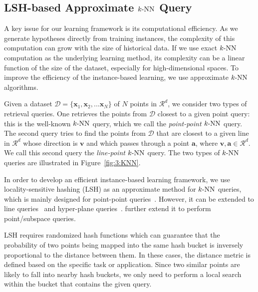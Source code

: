 \begin{figure}[htb]
  \label{fig:3:oracle}
\end{figure}


\subsection{LSH-based Approximate $k\text{-NN}$ Query}
\label{sec:3:overview:lsh}
A key issue for our learning framework is its computational efficiency. As we generate hypotheses directly from training instances, the complexity of this computation can grow with the size of historical data. If we use exact $k\text{-NN}$ computation as the underlying learning method, its complexity can be a linear function of the size of the dataset, especially for high-dimensional spaces. To improve the efficiency of the instance-based learning, we use approximate $k\text{-NN}$ algorithms.

Given a dataset $\mathcal D = \{\mathbf x_1, \mathbf x_2, ... \mathbf x_N\}$ of $N$ points in $\mathcal R^d$, we consider two types of retrieval queries. One retrieves the points from $\mathcal D$ closest to a given point query: this is the well-known $k\text{-NN}$ query, which we call the \emph{point-point $k\text{-NN}$} query. The second query tries to find the points from $\mathcal D$ that are closest to a given line in $\mathcal R^d$ whose direction is $\mathbf v$ and which passes through a point $\mathbf a$, where $\mathbf v, \mathbf a \in \mathcal R^d$. We call this second query the \emph{line-point $k\text{-NN}$} query. The two types of $k\text{-NN}$ queries are illustrated in Figure~\ref{fig:3:KNN}.


In order to develop an efficient instance-based learning framework, we use locality-sensitive hashing (LSH) as an approximate method for $k\text{-NN}$ queries, which is mainly designed for point-point queries~\cite{Andoni:2008:NHA}. However, it can be extended to line queries~\cite{Andoni:2009:ALN} and hyper-plane queries~\cite{Jain:nips:2010}. \cite{Basri:2011} further extend it to perform point/subspace queries.

LSH requires randomized hash functions which can guarantee that the probability of two points being mapped into the same hash bucket is inversely proportional to the distance between them. In these cases, the distance metric is defined based on the specific task or application. Since two similar points are likely to fall into nearby hash buckets, we only need to perform a local search within the bucket that contains the given query.


